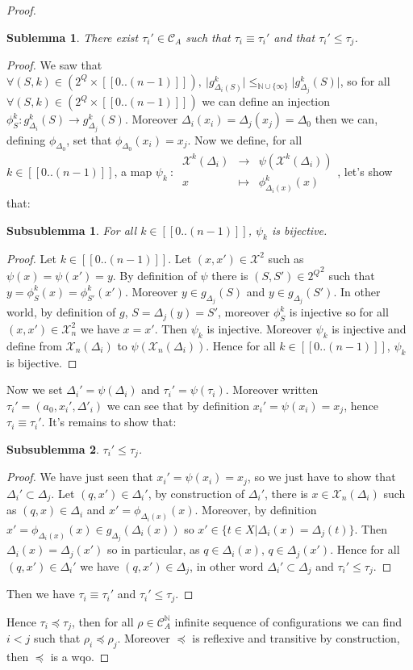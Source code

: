 \documentclass[a4paper,10pt]{report}
\newtheorem{slm}{Sublemma}[lm]
\newtheorem{sslm}{Subsublemma}[slm]
\newcommand{\dmap}[5]{
#1~:~\begin{array}{ccccc}
#2 &\to& #3 \\
#4  &\mapsto& #5
\end{array}}
\newcommand{\seg}[1]{[\![#1]\!]}
\newcommand{\ts}{\seg{0 .. (n-1)}}
\newcommand{\C}{\mathcal{C}_{A}}
\newcommand{\Xa}{\mathcal{X}}
\newcommand{\X}{\mathcal{X}_{n}}
\begin{document}
\begin {proof}
\begin{slm}
  There exist $\tau_i' \in \C$ such that $\tau_i \equiv \tau_i'$ and that  $\tau_i' \leq \tau_j$.
\end{slm}
\begin{proof}
We saw that $\forall (S,k) \in (2^Q \times \ts),\ \lvert g^k_{\Delta_i(S)} \lvert \leq_{\mathbb N \cup \{\infty\}} \lvert g^k_{\Delta_j}(S) \lvert$, 
so for all $\forall (S,k) \in (2^Q \times \ts)$ we can define an injection $\phi^k_S: g^k_{\Delta_i}(S) \to g^k_{\Delta_j}(S)$. 
Moreover $\Delta_i(x_i)=\Delta_j(x_j)=\Delta_0$ then we can, defining $\phi_{\Delta_0}$, set that $\phi_{\Delta_0}(x_i) = x_j$.
Now we define, for all $k \in \ts$, a map $\dmap{\psi_k}{\Xa^k(\Delta_i)}{\psi(\Xa^k(\Delta_i))}{x}{\phi^k_{\Delta_i(x)}(x)}$, let's show that:
\begin{sslm}
  For all $k \in \ts$, $\psi_k$ is bijective.
\end{sslm}
\begin{proof}
Let $k \in \ts$.
Let $(x,x') \in \Xa^2 $ such as $\psi(x)= \psi(x') = y$.
By definition of $\psi$ there is $(S,S')\in {2^Q}^2$ such that  $y = \phi_S^k(x) =\phi^k_{S'}(x')$. Moreover $y\in g_{\Delta_j}(S)$ and  $y\in g_{\Delta_j}(S')$. In other world, by definition of $g$,
$S=\Delta_j(y)=S'$, moreover $\phi^k_S$ is injective so for all $(x,x') \in \X^2 $ we have $ x=x'$.
Then  $\psi_k$ is injective.
Moreover $\psi_k$ is injective and define from $\X(\Delta_i)$ to $\psi(\X(\Delta_i))$.
Hence for all $k \in \ts$, $\psi_k$ is bijective.
\end{proof}
Now we set $\Delta_i'=\psi (\Delta_i)$ and $\tau_i'=\psi (\tau_i)$. 
Moreover written $ \tau_i'=(a_0,x_i',\Delta'_i)$ we can see that by definition $ x_i'=\psi(x_i)=x_j$, hence $\tau_i \equiv \tau_i'$.
It's remains to show that:
\begin{sslm}
  $\tau_i' \leq \tau_j$.
\end{sslm}

\begin{proof}
  We have just seen that $ x_i'=\psi(x_i)=x_j$, so we just have to show that $\Delta_i' \subset \Delta_j$.
  Let $(q,x') \in \Delta_i'$, by construction of $\Delta_i'$, there is $x \in \X(\Delta_i)$ such as $(q,x) \in \Delta_i$ and $x'=\phi_{\Delta_i(x)}(x)$.
  Moreover, by definition $x'=\phi_{\Delta_i(x)}(x) \in g_{\Delta_j}(\Delta_i(x))$ so $ x' \in \{ t \in X | \Delta_i(x)=\Delta_j(t) \}$.
  Then $\Delta_i(x)=\Delta_j(x')$ so in particular, as $q \in \Delta_i(x)$, $q \in \Delta_j(x')$.
  Hence for all $(q,x') \in \Delta_i'$ we have $(q,x') \in \Delta_j$, in other word $\Delta_i' \subset \Delta_j$ and $\tau_i' \leq \tau_j$.
\end{proof}
Then we have $\tau_i \equiv \tau_i'$ and  $\tau_i' \leq \tau_j$.
\end{proof}	
Hence $\tau_i \preceq \tau_j$, then for all $\rho \in \C^{\mathbb N}$ infinite sequence of configurations we can find $i < j$ such that $\rho_i \preceq \rho_j$.
Moreover $\preceq$ is reflexive and transitive by construction, then $\preceq$ is a wqo.

\end{proof}
\end{document}
